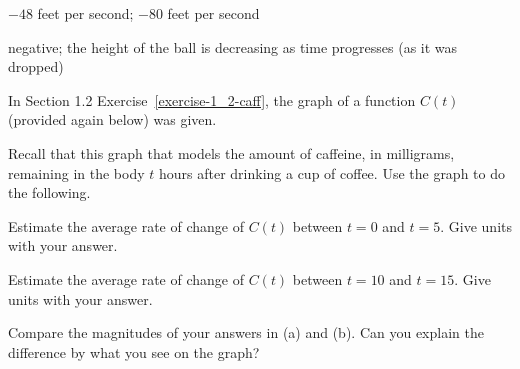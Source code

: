 \begin{solution}
    \begin{parts}
        \item $-48$ feet per second; $-80$ feet per second

        \item negative; the height of the ball is decreasing as time progresses (as it was dropped)
    \end{parts}
\end{solution}







\begin{exercise} In Section 1.2 Exercise~\ref{exercise-1_2-caff}, the graph of a function $C(t)$ (provided again below) was given.

\begin{center}
\end{center}

\noindent Recall that this graph that models the amount of caffeine, in milligrams, remaining in the body $t$ hours after drinking a cup of coffee. Use the graph to do the following.



\begin{parts}
    \item Estimate the average rate of change of $C(t)$ between $t=0$ and $t=5$. Give units with your answer. 

    \item Estimate the average rate of change of $C(t)$ between $t=10$ and $t=15$. Give units with your answer. 

    \item Compare the magnitudes of your answers in (a) and (b). Can you explain the difference by what you see on the graph? 
\end{parts}
\end{exercise}




